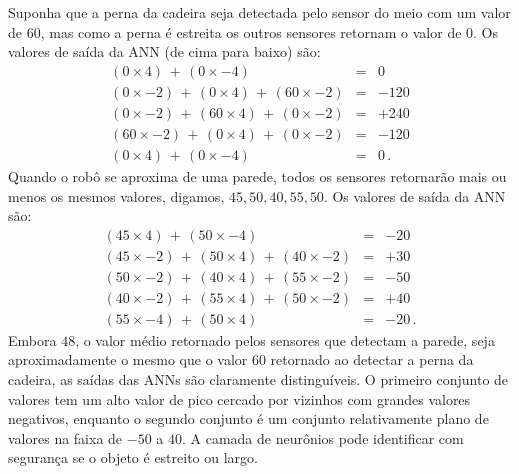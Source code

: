 Suponha que a perna da cadeira seja detectada pelo sensor do meio com um valor de $60$, mas como a perna é estreita os outros sensores retornam o valor de $0$. Os valores de saída da ANN (de cima para baixo) são:
\begin{eqnarray*}
(0\times 4) \,+ \, (0\times -4) &=& 0\\
(0\times -2) \,+ \, (0\times 4) \,+ \, (60\times -2)&=&-120\\
(0\times -2) \,+ \, (60\times 4) \,+ \,  (0\times -2)&=&+240\\
(60\times -2) \,+ \, (0\times 4) \,+ \, (0\times -2)&=&-120\\
(0\times 4) \,+ \, (0\times -4) &=&0\,.
\end{eqnarray*}
Quando o robô se aproxima de uma parede, todos os sensores retornarão mais ou menos os mesmos valores, digamos, $45, 50, 40, 55, 50$. Os valores de saída da ANN são:
\begin{eqnarray*}
(45\times 4)  \,+ \, (50\times -4)&=&-20\\
(45\times -2) \,+ \, (50\times 4) \,+ \, (40\times -2)&=&+30\\
(50\times -2) \,+ \, (40\times 4) \,+ \, (55\times -2)&=&-50\\
(40\times -2) \,+ \, (55\times 4) \,+ \, (50\times -2)&=&+40\\
(55\times -4) \,+ \, (50\times 4)&=&-20\,.
\end{eqnarray*}
Embora $48$, o valor médio retornado pelos sensores que detectam a parede, seja aproximadamente o mesmo que o valor $60$ retornado ao detectar a perna da cadeira, as saídas das ANNs são claramente distinguíveis. O primeiro conjunto de valores tem um alto valor de pico cercado por vizinhos com grandes valores negativos, enquanto o segundo conjunto é um conjunto relativamente plano de valores na faixa de $-50$ a $40$. A camada de neurônios pode identificar com segurança se o objeto é estreito ou largo.

